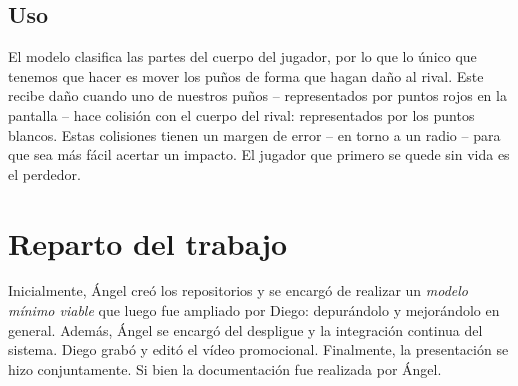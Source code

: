 \documentclass{article}
\begin{document}
\subsection{Uso}
El modelo clasifica las partes del cuerpo del jugador, por lo que lo único que tenemos que hacer es mover los puños de forma que hagan daño al rival. Este recibe daño cuando uno de nuestros puños -- representados por puntos rojos en la pantalla -- hace colisión con el cuerpo del rival: representados por los puntos blancos. Estas colisiones tienen un margen de error -- en torno a un radio -- para que sea más fácil acertar un impacto. El jugador que primero se quede sin vida es el perdedor.

\section{Reparto del trabajo}
\label{section:work}
Inicialmente, Ángel creó los repositorios y se encargó de realizar un \textit{modelo mínimo viable} que luego fue ampliado por Diego: depurándolo y mejorándolo en general. Además, Ángel se encargó del despligue y la integración continua del sistema. Diego grabó y editó el vídeo promocional. Finalmente, la presentación se hizo conjuntamente. Si bien la documentación fue realizada por Ángel.
\end{document}
